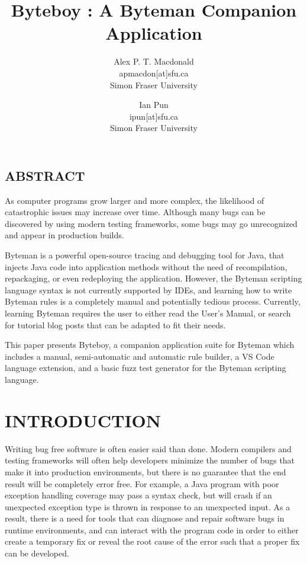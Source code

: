 \documentclass[letterpaper,twocolumn,10pt]{article}
\begin{document}
\date{}

\title{\Large \bf Byteboy : A Byteman Companion Application}

\author{
{\rm Alex P. T. Macdonald}\\
apmacdon[at]sfu.ca\\
Simon Fraser University
\and
{\rm Ian Pun}\\
ipun[at]sfu.ca\\
Simon Fraser University
} %

\maketitle

\subsection*{ABSTRACT}
As computer programs grow larger and more complex, the likelihood of catastrophic issues may increase over time. Although many bugs can be discovered by using modern testing frameworks, some bugs may go unrecognized and appear in production builds. 

Byteman is a powerful open-source tracing and debugging tool for Java, that injects Java code into application methods without the need of recompilation, repackaging, or even redeploying the application. However, the Byteman scripting language syntax is not currently supported by IDEs, and learning how to write Byteman rules is a completely manual and potentially tedious process. Currently, learning Byteman requires the user to either read the User's Manual, or search for tutorial blog posts that can be adapted to fit their needs. 

This paper presents Byteboy, a companion application suite for Byteman which includes a manual, semi-automatic and automatic rule builder, a VS Code language extension, and a basic fuzz test generator for the Byteman scripting language.  

\section{INTRODUCTION}

Writing bug free software is often easier said than done. Modern compilers and testing frameworks will often help developers minimize the number of bugs that make it into production environments, but there is no guarantee that the end result will be completely error free. For example, a Java program with poor exception handling coverage may pass a syntax check, but will crash if an unexpected exception type is thrown in response to an unexpected input. As a result, there is a need for tools that can diagnose and repair software bugs in runtime environments, and can interact with the program code in order to either create a temporary fix or reveal the root cause of the error such that a proper fix can be developed.
\end{document}
